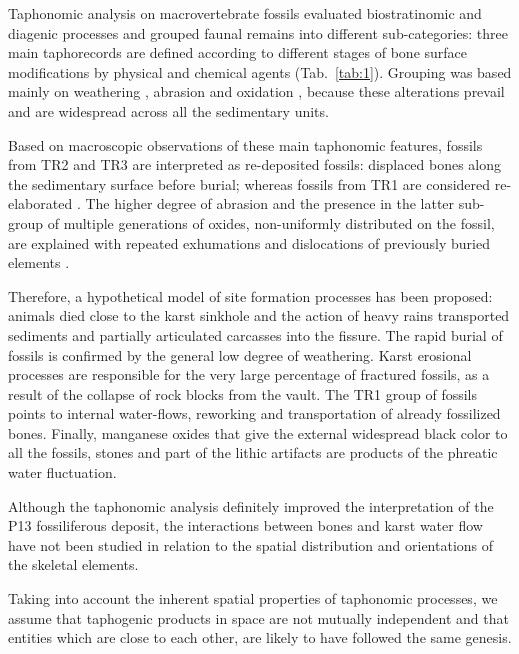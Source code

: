 \documentclass[review,authoryear]{elsarticle} %
\begin{document}
Taphonomic analysis \citep{Bagnus2011} on macrovertebrate fossils evaluated biostratinomic and diagenic processes and grouped faunal remains into different sub-categories: three main taphorecords \citep[TRs, \emph{sensu}][]{Fernandez-Lopez1987} are defined according to different stages of bone surface modifications by physical and chemical agents (Tab.~\ref{tab:1}). Grouping was based mainly on weathering \citep{Behrensmeyer1978,Diez1999,Kos2003,Torres2003}, abrasion \citep{Behrensmeyer1991} and oxidation \citep{Hill1982,Lopez-Gonzalez2006,White1976,White2009}, because these alterations prevail and are widespread across all the sedimentary units.

Based on macroscopic observations of these main taphonomic features, fossils from TR2 and TR3 are interpreted as re-deposited fossils: displaced bones along the sedimentary surface before burial; whereas fossils from TR1 are considered re-elaborated \citep[\emph{sensu}][]{Fernandez-Lopez1991,Fernandez-Lopez2007,Fernandez-Lopez2011}. The higher degree of abrasion and the presence in the latter sub-group of multiple generations of oxides, non-uniformly distributed on the fossil, are explained with repeated exhumations and dislocations of previously buried elements \citep{Lopez-Gonzalez2006}.

Therefore, a hypothetical model of site formation processes has been proposed: animals died close to the karst sinkhole and the action of heavy rains transported sediments and partially articulated carcasses into the fissure. The rapid burial of fossils is confirmed by the general low degree of weathering. Karst erosional processes are responsible for the very large percentage of fractured fossils, as a result of the collapse of rock blocks from the vault. The TR1 group of fossils points to internal water-flows, reworking and transportation of already fossilized bones. Finally, manganese oxides that give the external widespread black color to all the fossils, stones and part of the lithic artifacts are products of the phreatic water fluctuation.

Although the taphonomic analysis definitely improved the interpretation of the P13 fossiliferous deposit, the interactions between bones and karst water flow have not been studied in relation to the spatial distribution and orientations of the skeletal elements.

Taking into account the inherent spatial properties of taphonomic processes, we assume that taphogenic products \citep[\emph{sensu}][]{Fernandez-Lopez2000} in space are not mutually independent and that entities which are close to each other, are likely to have followed the same genesis.
\end{document}
